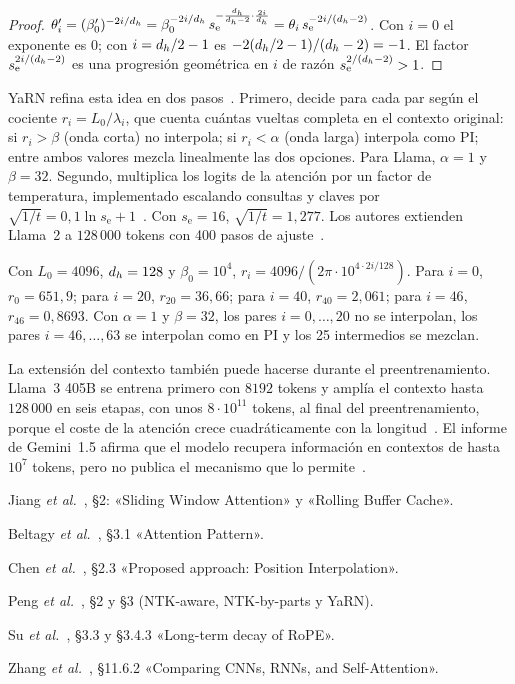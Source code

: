\begin{proof}
$\theta_i'=(\beta_0')^{-2i/d_{h}}=\beta_0^{-2i/d_{h}}\,s_{\mathrm{e}}^{-\frac{d_{h}}{d_{h}-2}\cdot\frac{2i}{d_{h}}}=\theta_i\,s_{\mathrm{e}}^{-2i/(d_{h}-2)}$. Con $i=0$ el exponente es $0$; con $i=d_{h}/2-1$ es $-2(d_{h}/2-1)/(d_{h}-2)=-1$. El factor $s_{\mathrm{e}}^{2i/(d_{h}-2)}$ es una progresión geométrica en $i$ de razón $s_{\mathrm{e}}^{2/(d_{h}-2)}>1$.
\end{proof}

YaRN refina esta idea en dos pasos~\cite[§3.2 y §3.3]{yarn}. Primero, decide para cada par según el cociente $r_i=L_0/\lambda_i$, que cuenta cuántas vueltas completa en el contexto original: si $r_i>\beta$ (onda corta) no interpola; si $r_i<\alpha$ (onda larga) interpola como PI; entre ambos valores mezcla linealmente las dos opciones. Para Llama, $\alpha=1$ y $\beta=32$. Segundo, multiplica los logits de la atención por un factor de temperatura, implementado escalando consultas y claves por $\sqrt{1/t}=0{,}1\ln s_{\mathrm{e}}+1$~\cite[§3.3]{yarn}. Con $s_{\mathrm{e}}=16$, $\sqrt{1/t}=1{,}277$. Los autores extienden Llama~2 a $128\,000$ tokens con 400 pasos de ajuste~\cite[§4.1]{yarn}.

\begin{ejemplo}\label{ej:yarn}
Con $L_0=4096$, $d_{h}=128$ y $\beta_0=10^{4}$, $r_i=4096/(2\pi\cdot 10^{4\cdot 2i/128})$. Para $i=0$, $r_0=651{,}9$; para $i=20$, $r_{20}=36{,}66$; para $i=40$, $r_{40}=2{,}061$; para $i=46$, $r_{46}=0{,}8693$. Con $\alpha=1$ y $\beta=32$, los pares $i=0,\dots,20$ no se interpolan, los pares $i=46,\dots,63$ se interpolan como en PI y los 25 intermedios se mezclan.
\end{ejemplo}

\begin{observacion}
La extensión del contexto también puede hacerse durante el preentrenamiento. Llama~3 405B se entrena primero con $8192$ tokens y amplía el contexto hasta $128\,000$ en seis etapas, con unos $8\cdot 10^{11}$ tokens, al final del preentrenamiento, porque el coste de la atención crece cuadráticamente con la longitud~\cite[§3.4.2]{llama3}. El informe de Gemini~1.5 afirma que el modelo recupera información en contextos de hasta $10^{7}$ tokens, pero no publica el mecanismo que lo permite~\cite[§3.1]{gemini15}.
\end{observacion}

\begin{lecturas}
\item Jiang \emph{et al.}~\cite{mistral}, §2: «Sliding Window Attention» y «Rolling Buffer Cache».
\item Beltagy \emph{et al.}~\cite{longformer}, §3.1 «Attention Pattern».
\item Chen \emph{et al.}~\cite{pi}, §2.3 «Proposed approach: Position Interpolation».
\item Peng \emph{et al.}~\cite{yarn}, §2 y §3 (NTK-aware, NTK-by-parts y YaRN).
\item Su \emph{et al.}~\cite{roformer}, §3.3 y §3.4.3 «Long-term decay of RoPE».
\item Zhang \emph{et al.}~\cite{d2l}, §11.6.2 «Comparing CNNs, RNNs, and Self-Attention».
\end{lecturas}


